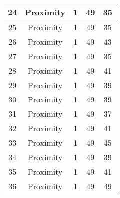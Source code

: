 \documentclass[results.tex]{subfiles}
\begin{document}
\begin{center}
\begin{tabular}{| c || c | c | c | c |}
            \hline
            24                      & Proximity                    & 1                      & 49                      & 35                   \\
            \hline
            25                      & Proximity                    & 1                      & 49                      & 35                   \\
            \hline
            26                      & Proximity                    & 1                      & 49                      & 43                   \\
            \hline
            27                      & Proximity                    & 1                      & 49                      & 35                   \\
            \hline
            28                      & Proximity                    & 1                      & 49                      & 41                   \\
            \hline
            29                      & Proximity                    & 1                      & 49                      & 39                   \\
            \hline
            30                      & Proximity                    & 1                      & 49                      & 39                   \\
            \hline
            31                      & Proximity                    & 1                      & 49                      & 37                   \\
            \hline
            32                      & Proximity                    & 1                      & 49                      & 41                   \\
            \hline
            33                      & Proximity                    & 1                      & 49                      & 45                   \\
            \hline
            34                      & Proximity                    & 1                      & 49                      & 39                   \\
            \hline
            35                      & Proximity                    & 1                      & 49                      & 41                   \\
            \hline
            36                      & Proximity                    & 1                      & 49                      & 49                   \\

\end{tabular}
\end{center}
\end{document}
